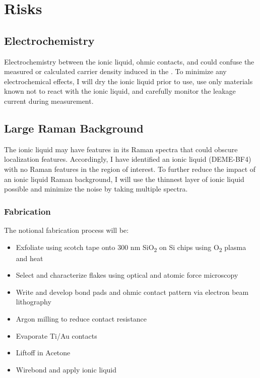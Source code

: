 \documentclass[11pt]{article}
\begin{document}
\section{Risks}

\subsection{Electrochemistry}
Electrochemistry between the ionic liquid, ohmic contacts, and \rucl could confuse the measured or calculated carrier density induced in the \ruclnospace. To minimize any electrochemical effects, I will dry the ionic liquid prior to use, use only materials known not to react with the ionic liquid, and carefully monitor the leakage current during measurement.

\subsection{Large Raman Background}
The ionic liquid may have features in its Raman spectra that could obscure localization features. Accordingly, I have identified an ionic liquid (DEME-BF4) with no Raman features in the region of interest. To further reduce the impact of an ionic liquid Raman background, I will use the thinnest layer of ionic liquid possible and minimize the noise by taking multiple spectra.

\subsubsection{Fabrication}

The notional fabrication process will be:

\begin{itemize}
	\item Exfoliate \rucl using scotch tape onto 300 nm SiO\textsubscript{2} on Si chips using O\textsubscript{2} plasma and heat
	\item Select and characterize flakes using optical and atomic force microscopy
	\item Write and develop bond pads and ohmic contact pattern via electron beam lithography
	\item Argon milling to reduce contact resistance
	\item Evaporate Ti/Au contacts
	\item Liftoff in Acetone
	\item Wirebond and apply ionic liquid
\end{itemize}
\end{document}
